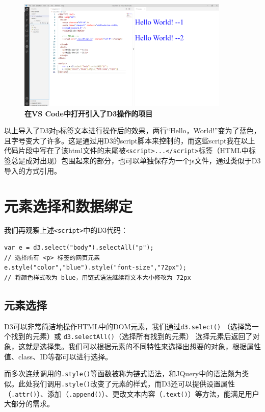 \begin{figure}[htbp]
    \centering
    \includegraphics[width=0.9\textwidth]{figure/D3/open_in_vscode.png}
    \caption{\textbf{在VS Code中打开引入了D3操作的项目}}
    \label{fig:open_in_vscode}
\end{figure}

以上导入了D3对p标签文本进行操作后的效果，两行``Hello，World!''变为了蓝色，且字号变大了许多。这是通过用D3的script脚本来控制的，而这些script我在以上代码片段中写在了该html文件的末尾被\verb|<script>...</script>|标签（HTML中标签总是成对出现）包围起来的部分，也可以单独保存为一个js文件，通过类似于D3导入的方式引用。

\section{元素选择和数据绑定}

我们再观察上述\verb|<script>|中的D3代码：

\begin{verbatim}
var e = d3.select("body").selectAll("p");
// 选择所有 <p> 标签的网页元素
e.style("color","blue").style("font-size","72px");
// 将颜色样式改为 blue，用链式语法继续将文本大小修改为 72px
\end{verbatim}

\subsection{元素选择}

D3可以非常简洁地操作HTML中的DOM元素，我们通过\verb|d3.select()| （选择第一个找到的元素）或 \verb|d3.selectAll()|（选择所有找到的元素） 选择元素后返回了对象，这就是选择集。我们可以根据元素的不同特性来选择出想要的对象，根据属性值、class、ID等都可以进行选择。

而多次连续调用的\verb|.style()|等函数被称为链式语法，和JQuery中的语法颇为类似。此处我们调用\verb|.style()|改变了元素的样式，而D3还可以提供设置属性（\verb|.attr()|）、添加（\verb|.append()|）、更改文本内容（\verb|.text()|）等方法，能满足用户大部分的需求。

